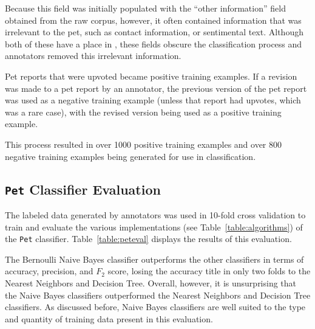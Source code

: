 Because this field was initially populated with the ``other information'' field obtained from the raw corpus, however, it often contained information that was irrelevant to the pet, such as contact information, or sentimental text.  Although both of these have a place in \nplh{}, these fields obscure the classification process and annotators removed this irrelevant information.

Pet reports that were upvoted became positive training examples.  If a revision was made to a pet report by an annotator, the previous version of the pet report was used as a negative training example (unless that report had upvotes, which was a rare case), with the revised version being used as a positive training example.

This process resulted in over 1000 positive training examples and over 800 negative training examples being generated for use in classification.

\subsection {{\tt Pet} Classifier Evaluation}

The labeled data generated by annotators was used in 10-fold cross validation to train and evaluate the various implementations (see Table~\ref{table:algorithms}) of the {\tt Pet} classifier.  Table~\ref{table:peteval} displays the results of this evaluation.

The Bernoulli Naive Bayes classifier outperforms the other classifiers in terms of accuracy, precision, and $F_2$ score, losing the accuracy title in only two folds to the Nearest Neighbors and Decision Tree.  Overall, however, it is unsurprising that the Naive Bayes classifiers outperformed the Nearest Neighbors and Decision Tree classifiers.  As discussed before, Naive Bayes classifiers are well suited to the type and quantity of training data present in this evaluation.  

